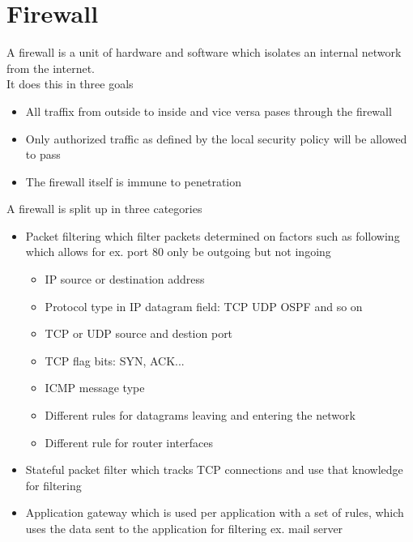 \documentclass[12pt, a4paper]{article}
\begin{document}
	\section{Firewall}
		A firewall is a unit of hardware and software which isolates an internal network from the internet.\\
		It does this in three goals
		\begin{itemize}
			\item All traffix from outside to inside and vice versa pases through the firewall
			\item Only authorized traffic as defined by the local security policy will be allowed to pass
			\item The firewall itself is immune to penetration
		\end{itemize}
		A firewall is split up in three categories
		\begin{itemize}
			\item Packet filtering which filter packets determined on factors such as following which allows for ex. port 80 only be outgoing but not ingoing
			\begin{itemize}
				\item IP source or destination address
				\item Protocol type in IP datagram field: TCP UDP OSPF and so on
				\item TCP or UDP source and destion port
				\item TCP flag bits: SYN, ACK...
				\item ICMP message type
				\item Different rules for datagrams leaving and entering the network
				\item Different rule for router interfaces
			\end{itemize}
			\item Stateful packet filter which tracks TCP connections and use that knowledge for filtering
			\item Application gateway which is used per application with a set of rules, which uses the data sent to the application for filtering ex. mail server
		\end{itemize}
\end{document}

